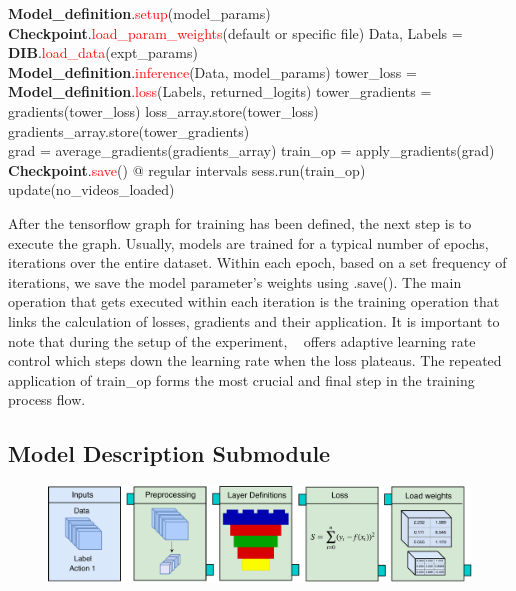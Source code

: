 \documentclass{llncs}
\begin{document}
\begin{algorithmic}[H]
\State \textbf{Model\_definition}.\textcolor{red}{setup}(model\_params)
\State \textbf{Checkpoint}.\textcolor{red}{load\_param\_weights}(default or specific file)
\State Data, Labels = \textbf{DIB}.\textcolor{red}{load\_data}(expt\_params)
\\
\State \textbf{Model\_definition}.\textcolor{red}{inference}(Data, model\_params)
\State tower\_loss = \textbf{Model\_definition}.\textcolor{red}{loss}(Labels, returned\_logits)
\State tower\_gradients = gradients(tower\_loss)
\State loss\_array.store(tower\_loss)
\State gradients\_array.store(tower\_gradients)
\EndFor
\\
\State grad = average\_gradients(gradients\_array)
\State train\_op = apply\_gradients(grad)
\\
\State \textbf{Checkpoint}.\textcolor{red}{save}() @ regular intervals
\State sess.run(train\_op)
\State update(no\_videos\_loaded)
\EndWhile
\EndProcedure
\end{algorithmic}

After the tensorflow graph for training has been defined, the next step is to execute the graph.
Usually, models are trained for a typical number of epochs, iterations over the entire dataset.
Within each epoch, based on a set frequency of iterations, we save the model parameter's weights using \checkpoint.save().
The main operation that gets executed within each iteration is the training operation that links the calculation of losses, gradients and their application.
It is important to note that during the setup of the experiment, \acro~ offers adaptive learning rate control which steps down the learning rate when the loss plateaus.
The repeated application of train\_op forms the most crucial and final step in the training process flow.

\subsection{Model Description Submodule}
\label{sec:modeldesc}
\begin{figure}[b!]
\centering
\includegraphics[width=\columnwidth]{images/model_submodule.pdf}
\caption{}
\label{fig:model_submodule}
\end{figure}
\end{document}
